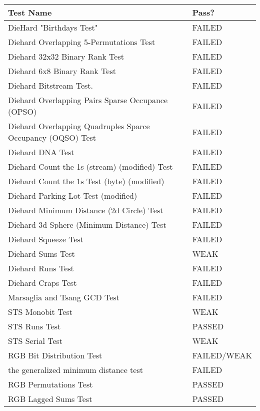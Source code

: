 \begin{table}[H]
    \begin{tabular}{| l | l |}
    
    \hline
    Test Name & Pass? \\
    \hline
    DieHard "Birthdays Test" & FAILED \\
    \hline
    Diehard Overlapping 5-Permutations Test & FAILED \\
    \hline
    Diehard 32x32 Binary Rank Test & FAILED \\
    \hline
    Diehard 6x8 Binary Rank Test & FAILED \\
    \hline
    Diehard Bitstream Test. & FAILED \\
    \hline
    Diehard Overlapping Pairs Sparse Occupance (OPSO) & FAILED \\
    \hline
    Diehard Overlapping Quadruples Sparce Occupancy (OQSO) Test & FAILED \\
    \hline
    Diehard DNA Test & FAILED \\
    \hline
    Diehard Count the 1s (stream) (modified) Test & FAILED \\
    \hline
    Diehard Count the 1s Test (byte) (modified) & FAILED \\
    \hline
    Diehard Parking Lot Test (modified) & FAILED \\
    \hline
    Diehard Minimum Distance (2d Circle) Test & FAILED \\
    \hline
    Diehard 3d Sphere (Minimum Distance) Test & FAILED \\
    \hline
    Diehard Squeeze Test & FAILED \\
    \hline
    Diehard Sums Test & WEAK \\
    \hline
    Diehard Runs Test & FAILED \\
    \hline
    Diehard Craps Test & FAILED \\
    \hline
    Marsaglia and Tsang GCD Test & FAILED \\
    \hline
    STS Monobit Test & WEAK \\
    \hline
    STS Runs Test & PASSED \\
    \hline
    STS Serial Test & WEAK \\
    \hline
    RGB Bit Distribution Test & FAILED/WEAK \\
    \hline
    the generalized minimum distance test & FAILED \\
    \hline
    RGB Permutations Test & PASSED \\
    \hline
    RGB Lagged Sums Test & PASSED \\

\end{tabular}
\end{table}

